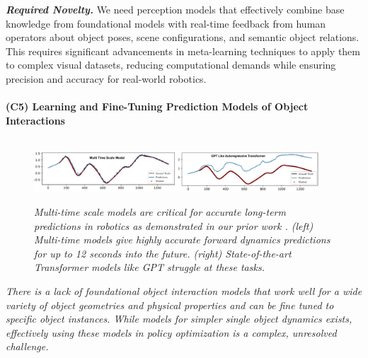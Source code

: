 \documentclass{erc-B2}
\begin{document}
\textit{\textbf{Required Novelty.}} We need perception models that effectively combine base knowledge from foundational models with real-time feedback from human operators about object poses, scene configurations, and semantic object relations. This requires significant advancements in meta-learning techniques to apply them to complex visual datasets, reducing computational demands while ensuring precision and accuracy for real-world robotics.

\paragraph{(C5) Learning and Fine-Tuning Prediction Models of Object Interactions}

\begin{figure}[t]
    \centering
    \includegraphics[height=0.9in,width=0.95\textwidth]{img/longterm/predictions.pdf}
    \caption{\small \textit{Multi-time scale models are critical for accurate long-term predictions in robotics as demonstrated in our prior work \cite{shaj2023mts3}. (left) Multi-time models \cite{shaj2023mts3} give highly accurate forward dynamics predictions for up to 12 seconds into the future. (right) State-of-the-art Transformer models like GPT struggle at these tasks.}}
    \label{fig:pred}
\end{figure}

\textit{There is a lack of foundational object interaction models that work well for a wide variety of object geometries and physical properties and can be fine tuned to specific object instances. While models for simpler single object dynamics exists, effectively using these models in policy optimization is a complex, unresolved challenge.}
\end{document}
